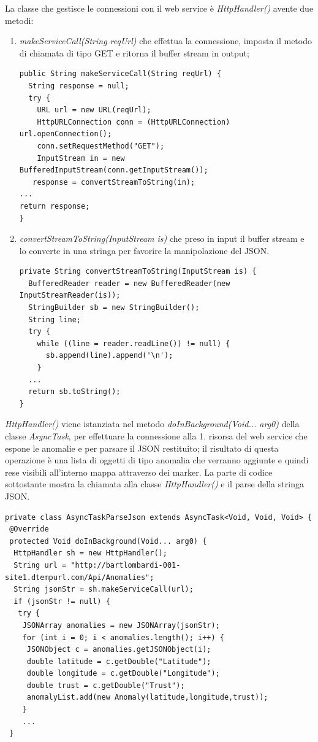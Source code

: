 \documentclass[a4paper, 11pt]{article} %
\begin{document}
La classe che gestisce le connessioni con il web service è \textit{HttpHandler()} avente due metodi: 
\begin{enumerate}
	\item \textit{makeServiceCall(String reqUrl)} che effettua la connessione, imposta il metodo di chiamata di tipo GET e ritorna il buffer stream in output;
\begin{lstlisting}
public String makeServiceCall(String reqUrl) {
  String response = null;
  try {
    URL url = new URL(reqUrl);
    HttpURLConnection conn = (HttpURLConnection) url.openConnection();
    conn.setRequestMethod("GET");
    InputStream in = new BufferedInputStream(conn.getInputStream());
   response = convertStreamToString(in);
...
return response;
}
\end{lstlisting}
	\item \textit{convertStreamToString(InputStream is)} che preso in input il buffer stream e lo converte in una stringa per favorire la manipolazione del JSON.
\begin{lstlisting}
private String convertStreamToString(InputStream is) {
  BufferedReader reader = new BufferedReader(new InputStreamReader(is));
  StringBuilder sb = new StringBuilder();
  String line;
  try {
    while ((line = reader.readLine()) != null) {
      sb.append(line).append('\n');
    }
  ...
  return sb.toString();
}
\end{lstlisting}	
\end{enumerate}
\textit{HttpHandler()} viene istanziata nel metodo \textit{doInBackground(Void... arg0)} della classe \textit{AsyncTask}, per effettuare la connessione alla 1. risorsa del web service che espone le anomalie e per parsare il JSON restituito; il risultato di questa operazione è una lista di oggetti di tipo anomalia che verranno aggiunte e quindi rese visibili all'interno mappa attraverso dei marker. La parte di codice sottostante mostra la chiamata alla classe \textit{HttpHandler()} e il parse della stringa JSON.
\begin{lstlisting}
private class AsyncTaskParseJson extends AsyncTask<Void, Void, Void> {
 @Override
 protected Void doInBackground(Void... arg0) {
  HttpHandler sh = new HttpHandler();
  String url = "http://bartlombardi-001-site1.dtempurl.com/Api/Anomalies";
  String jsonStr = sh.makeServiceCall(url);
  if (jsonStr != null) {
   try {
    JSONArray anomalies = new JSONArray(jsonStr);
    for (int i = 0; i < anomalies.length(); i++) {
     JSONObject c = anomalies.getJSONObject(i);
     double latitude = c.getDouble("Latitude");
     double longitude = c.getDouble("Longitude");
     double trust = c.getDouble("Trust");
     anomalyList.add(new Anomaly(latitude,longitude,trust));
    }
    ...
 }
\end{lstlisting}
\end{document}
